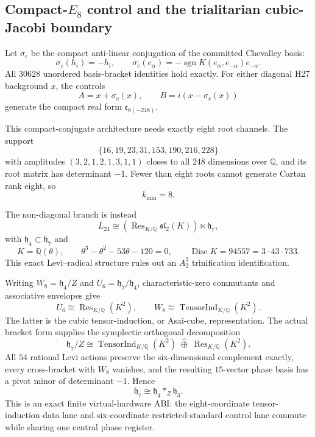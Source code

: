 \subsection*{Compact-$E_8$ control and the trialitarian cubic-Jacobi boundary}

Let $\sigma_c$ be the compact anti-linear conjugation of the committed
Chevalley basis:
\[
\sigma_c(h_i)=-h_i,\qquad
\sigma_c(e_\alpha)=
-\operatorname{sgn}K(e_\alpha,e_{-\alpha})e_{-\alpha}.
\]
All $30628$ unordered basis-bracket identities hold exactly.  For either
diagonal H27 background $x$, the controls
\[
A=x+\sigma_c(x),\qquad B=i(x-\sigma_c(x))
\]
generate the compact real form $\mathfrak e_{8(-248)}$.

This compact-conjugate architecture needs exactly eight root channels.  The
support
\[
\{16,19,23,31,153,190,216,228\}
\]
with amplitudes $(3,2,1,2,1,3,1,1)$ closes to all $248$ dimensions over
$\mathbb Q$, and its root matrix has determinant $-1$.  Fewer than eight
roots cannot generate Cartan rank eight, so
\[
\boxed{k_{\min}=8}.
\]

The non-diagonal branch is instead
\[
L_{24}\cong
\left(\operatorname{Res}_{K/\mathbb Q}\mathfrak{sl}_2(K)\right)
\ltimes\mathfrak h_7,
\]
with $\mathfrak h_4\subset\mathfrak h_7$ and
\[
K=\mathbb Q(\theta),\qquad
\theta^3-\theta^2-53\theta-120=0,\qquad
\operatorname{Disc}K=94557=3\cdot43\cdot733.
\]
This exact Levi--radical structure rules out an $A_2^3$ trinification
identification.

Writing $W_8=\mathfrak h_4/Z$ and
$U_6=\mathfrak h_7/\mathfrak h_4$, characteristic-zero commutants and
associative envelopes give
\[
U_6\cong\operatorname{Res}_{K/\mathbb Q}(K^2),\qquad
W_8\cong\operatorname{TensorInd}_{K/\mathbb Q}(K^2).
\]
The latter is the cubic tensor-induction, or Asai-cube, representation.
The actual bracket form supplies the symplectic orthogonal decomposition
\[
\mathfrak h_7/Z
\cong
\operatorname{TensorInd}_{K/\mathbb Q}(K^2)
\;\widehat\oplus\;
\operatorname{Res}_{K/\mathbb Q}(K^2).
\]
All $54$ rational Levi actions preserve the six-dimensional complement
exactly, every cross-bracket with $W_8$ vanishes, and the resulting
$15$-vector phase basis has a pivot minor of determinant $-1$.  Hence
\[
\mathfrak h_7\cong\mathfrak h_4*_{Z}\mathfrak h_3.
\]
This is an exact finite virtual-hardware ABI: the eight-coordinate
tensor-induction data lane and six-coordinate restricted-standard control lane
commute while sharing one central phase register.

